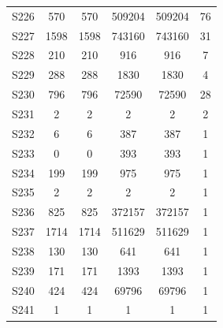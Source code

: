 {\begin{longtable}{l S[table-format=9.0] S[table-format=9.0] S[table-format=9.0] S[table-format=9.0] S[table-format=9.0]}
S226 & 570 & 570 & 509204 & 509204 & 76 \\
S227 & 1598 & 1598 & 743160 & 743160 & 31 \\
S228 & 210 & 210 & 916 & 916 & 7 \\
S229 & 288 & 288 & 1830 & 1830 & 4 \\
S230 & 796 & 796 & 72590 & 72590 & 28 \\
S231 & 2 & 2 & 2 & 2 & 2 \\
S232 & 6 & 6 & 387 & 387 & 1 \\
S233 & 0 & 0 & 393 & 393 & 1 \\
S234 & 199 & 199 & 975 & 975 & 1 \\
S235 & 2 & 2 & 2 & 2 & 1 \\
S236 & 825 & 825 & 372157 & 372157 & 1 \\
S237 & 1714 & 1714 & 511629 & 511629 & 1 \\
S238 & 130 & 130 & 641 & 641 & 1 \\
S239 & 171 & 171 & 1393 & 1393 & 1 \\
S240 & 424 & 424 & 69796 & 69796 & 1 \\
S241 & 1 & 1 & 1 & 1 & 1 \\
\end{longtable}
}